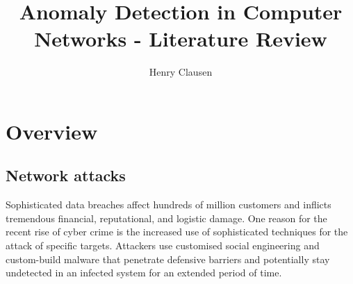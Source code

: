\documentclass[a4paper,12pt,twoside]{report}
\makeatletter
\newcommand*{\toccontents}{\@starttoc{toc}}
\makeatother
\begin{document}
\title{\LARGE {\bf Anomaly Detection in Computer Networks - Literature Review}\\
 \vspace*{6mm}
}

\author{Henry Clausen}

\maketitle

\toccontents


\chapter{Overview}

\section{Network attacks}

Sophisticated data breaches affect hundreds of million customers and inflicts tremendous financial, reputational, and logistic damage. %
One reason for the recent rise of cyber crime is the increased use of sophisticated techniques for the attack of specific targets. Attackers use customised social engineering and custom-build malware that penetrate defensive barriers and potentially stay undetected in an infected system for an extended period of time. 






\end{document}
